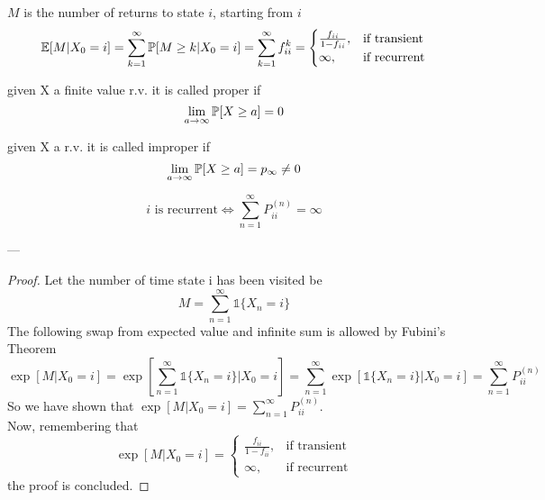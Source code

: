 	\begin{definition}
		$M$ is the number of returns to state $i$, starting from $i$
		$$\mathbb{E}[M | X_0 = i] = \sum\limits_{k=1}^\infty \mathbb{P}[M\geq k | X_0 = i] = \sum\limits_{k=1}^\infty f_{ii}^k = \begin{cases}
		\frac{f_{ii}}{1-f_{ii}}, & \text{if transient} \\
		\infty, & \text{if recurrent}
		\end{cases}$$
	\end{definition}

	\begin{definition}[Proper r.v]
		given X a finite value r.v. it is called proper if $$\lim_{a\to \infty} \mathbb{P}[X\geq a] = 0$$
	\end{definition}

	\begin{definition}[Improper r.v]
		given X a r.v. it is called improper if  $$\lim_{a\to \infty} \mathbb{P}[X\geq a] = p_\infty \ne 0$$
	\end{definition}

	\begin{theorem}
		$$i  \text{ is recurrent} \iff \sum\limits_{n=1}^\infty P_{ii}^{(n)} = \infty$$
	\end{theorem}
	---

	\begin{proof}
		Let the number of time state i has been visited be $$M = \sum\limits_{n=1}^\infty \mathds{1}\{X_n =i\} $$
		The following swap from expected value and infinite sum is allowed by Fubini's Theorem
		$$
			\exp[M | X_0 = i] = \exp\left[\sum\limits_{n=1}^\infty \mathds{1}\{X_n = i\} | X_0 = i\right]
			= \sum\limits_{n=1}^\infty \exp\left[\mathds{1}\{ X_n = i\} | X_0 = i\right] = \sum\limits_{n=1}^\infty P_{ii}^{(n)}
		$$
		So we have shown that $\exp[M | X_0=i] = \sum\limits_{n=1}^\infty P_{ii}^{(n)}$.\\
		Now, remembering that $$ \exp[M | X_0 = i] = \begin{cases}
		\frac{f_{ii}}{1-f_{ii}}, & \text{if transient} \\
		\infty, & \text{if recurrent}
		\end{cases}$$
		the proof is concluded.
	\end{proof}

